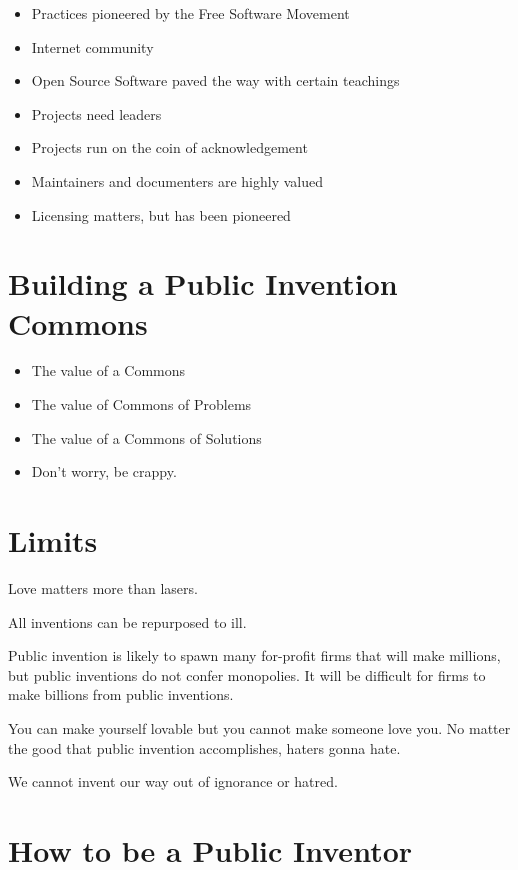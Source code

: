 \documentclass[
	fontsize=10pt, %
	twoside=false, %
	secnumdepth=1, %
]{kaobook}
\begin{document}
\begin{itemize}
\item Practices pioneered by the Free Software Movement
\item Internet community
\item Open Source Software paved the way with certain teachings
\item Projects need leaders
\item Projects run on the coin of acknowledgement
\item Maintainers and documenters are highly valued
\item Licensing matters, but has been pioneered
\end{itemize}

\chapter{Building a Public Invention Commons}
\begin{itemize}
\item The value of a Commons
\item The value of Commons of Problems
\item The value of a Commons of Solutions
\item Don’t worry, be crappy.
\end{itemize}

\chapter{Limits}

Love matters more than lasers.

All inventions can be repurposed to ill.

Public invention is likely to spawn many for-profit firms that will make millions,
but public inventions do not confer monopolies.
It will be difficult for firms to make billions from public inventions.

You can make yourself lovable but you cannot make someone love you.
No matter the good that public invention accomplishes, haters gonna hate.

We cannot invent our way out of ignorance or hatred.


\chapter{How to be a Public Inventor}
\end{document}
